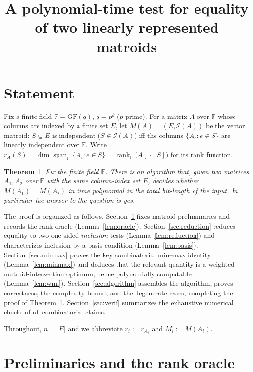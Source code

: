 \documentclass{amsart}
\theoremstyle{plain}
\newtheorem{theorem}{Theorem}
\theoremstyle{definition}
\DeclareMathOperator{\rank}{rank}
\DeclareMathOperator{\spann}{span}
\newcommand{\I}{\mathcal{I}}
\newcommand{\F}{\mathbb{F}}
\begin{document}
\title{A polynomial-time test for equality of two linearly represented matroids}
\maketitle

\section*{Statement}

Fix a finite field $\F=\mathrm{GF}(q)$, $q=p^{k}$ ($p$ prime). For a matrix $A$ over
$\F$ whose columns are indexed by a finite set $E$, let $M(A)=(E,\I(A))$ be the vector
matroid: $S\subseteq E$ is independent ($S\in\I(A)$) iff the columns $\{A_e:e\in S\}$
are linearly independent over $\F$. Write $r_A(S)=\dim\spann_{\F}\{A_e:e\in S\}
=\rank_{\F}\bigl(A[\,\cdot\,,S]\bigr)$ for its rank function.

\begin{theorem}\label{thm:main}
Fix the finite field $\F$. There is an algorithm that, given two matrices $A_1,A_2$ over
$\F$ with the same column-index set $E$, decides whether $M(A_1)=M(A_2)$ in time
polynomial in the total bit-length of the input. In particular the answer to the
question is \emph{yes}.
\end{theorem}

The proof is organized as follows. Section~\ref{sec:prelim} fixes matroid preliminaries and
records the rank oracle (Lemma~\ref{lem:oracle}). Section~\ref{sec:reduction} reduces equality
to two one-sided \emph{inclusion} tests (Lemma~\ref{lem:reduction}) and characterizes inclusion
by a basis condition (Lemma~\ref{lem:basis}). Section~\ref{sec:minmax} proves the key
combinatorial min--max identity (Lemma~\ref{lem:minmax}) and deduces that the relevant quantity
is a weighted matroid-intersection optimum, hence polynomially computable
(Lemma~\ref{lem:wmi}). Section~\ref{sec:algorithm} assembles the algorithm, proves correctness,
the complexity bound, and the degenerate cases, completing the proof of
Theorem~\ref{thm:main}. Section~\ref{sec:verif} summarizes the exhaustive numerical checks of all
combinatorial claims.

Throughout, $n=|E|$ and we abbreviate $r_i:=r_{A_i}$ and $M_i:=M(A_i)$.

\section{Preliminaries and the rank oracle}\label{sec:prelim}
\end{document}
